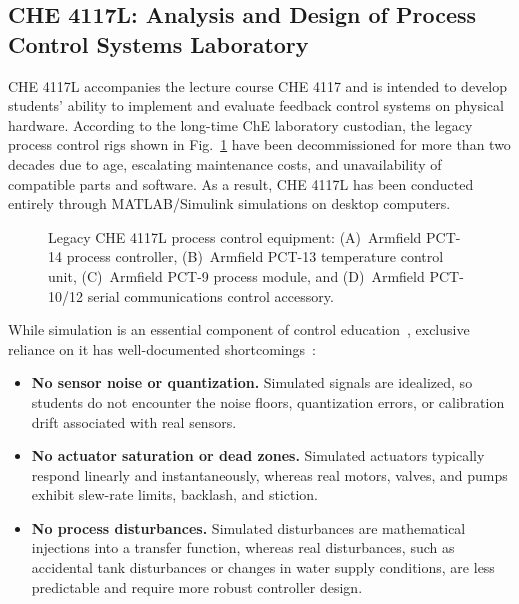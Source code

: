 
\subsection{CHE 4117L: Analysis and Design of Process Control Systems Laboratory} %
\label{subsec:che4117l}

CHE 4117L accompanies the lecture course CHE 4117 and is intended to develop students' ability to implement and evaluate feedback control systems on physical hardware. According to the long-time ChE laboratory custodian, the legacy process control rigs shown in Fig.~\ref{fig:legacy-4117} have been decommissioned for more than two decades due to age, escalating maintenance costs, and unavailability of compatible parts and software. As a result, CHE 4117L has been conducted entirely through MATLAB/Simulink simulations on desktop computers.

\begin{figure}[htbp]
    \centering
    \caption[Legacy CHE 4117L process control equipment]{Legacy CHE 4117L process control equipment: (A)~Armfield PCT-14 process controller, (B)~Armfield PCT-13 temperature control unit, (C)~Armfield PCT-9 process module, and (D)~Armfield PCT-10/12 serial communications control accessory.}
    \label{fig:legacy-4117}
\end{figure}

While simulation is an essential component of control education~\citep{astrom1985}, exclusive reliance on it has well-documented shortcomings~\citep{ma2006}:

\begin{itemize}
    \item \textbf{No sensor noise or quantization.} Simulated signals are idealized, so students do not encounter the noise floors, quantization errors, or calibration drift associated with real sensors.
    \item \textbf{No actuator saturation or dead zones.} Simulated actuators typically respond linearly and instantaneously, whereas real motors, valves, and pumps exhibit slew-rate limits, backlash, and stiction.
    \item \textbf{No process disturbances.} Simulated disturbances are mathematical injections into a transfer function, whereas real disturbances, such as accidental tank disturbances or changes in water supply conditions, are less predictable and require more robust controller design.
\end{itemize}

